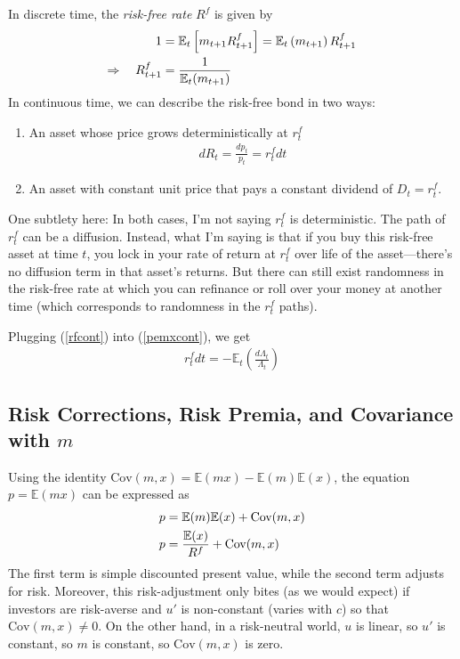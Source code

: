 \documentclass[12pt]{article}
\theoremstyle{plain}
\theoremstyle{definition}
\theoremstyle{remark}
\begin{document}
In discrete time, the \emph{risk-free rate} $R^f$ is given by
\begin{align}
    1 &= \mathbb{E}_t\left[m_{t+1} R^f_{t+1}\right]
    =  \mathbb{E}_t\left(m_{t+1}\right) R^f_{t+1} \notag \\
    \Rightarrow \quad R^f_{t+1}
    &= \frac{1}{\mathbb{E}_t(m_{t+1})}
\end{align}
In continuous time, we can describe the risk-free bond in two ways:
\begin{enumerate}
  \item An asset whose price grows deterministically at $r_t^f$
    \begin{align}
      dR_t = \frac{dp_t}{p_t} = r^f_t dt
      \label{rfcont}
    \end{align}

  \item An asset with constant unit price that pays a constant dividend
    of $D_t=r^f_t$.
\end{enumerate}
One subtlety here: In both cases, I'm not saying $r^f_t$ is
deterministic. The path of $r^f_t$ can be a diffusion. Instead, what I'm
saying is that if you buy this risk-free asset at time $t$, you lock in
your rate of return at $r^f_t$ over life of the asset---there's no
diffusion term in that asset's returns. But there can still exist
randomness in the risk-free rate at which you can refinance or roll over
your money at another time (which corresponds to randomness in the
$r^f_t$ paths).

Plugging (\ref{rfcont}) into (\ref{pemxcont}), we get
\begin{align}
  r^f_t dt = -\mathbb{E}_t\left(\frac{d\Lambda_t}{\Lambda_t}\right)
\end{align}

\subsection{Risk Corrections, Risk Premia, and Covariance with $m$}

Using the identity $\text{Cov}(m,x) = \mathbb{E}(mx) -
\mathbb{E}(m)\mathbb{E}(x)$, the equation $p=\mathbb{E}(mx)$ can be
expressed as
\begin{align}
  p &= \mathbb{E}(m)\mathbb{E}(x) + \text{Cov}(m,x)\notag\\
  p &= \frac{\mathbb{E}(x)}{R^f} + \text{Cov}(m,x)
    \label{eq:riskcorrectPrice}
\end{align}
The first term is simple discounted present value, while the second term
adjusts for risk. Moreover, this risk-adjustment only bites (as we
would expect) if investors are risk-averse and $u'$ is non-constant (varies
with $c$) so that $\text{Cov}(m,x)\neq 0$.  On the other hand, in a
risk-neutral world, $u$ is linear, so $u'$ is constant, so $m$ is
constant, so $\text{Cov}(m,x)$ is zero.
\end{document}
